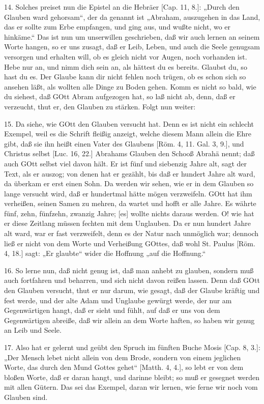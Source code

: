 14. Solches preiset nun die Epistel an die Hebräer [Cap. 11, 8.]: „Durch den Glauben ward gehorsam“, der da genannt ist „Abraham, auszugehen in das Land, das er sollte zum Erbe empfangen, und ging aus, und wußte nicht, wo er hinkäme.“ Das ist nun um unserwillen geschrieben, daß wir auch lernen an seinem Worte hangen, so er uns zusagt, daß er Leib, Leben, und auch die Seele genugsam versorgen und erhalten will, ob es gleich nicht vor Augen, noch vorhanden ist. Hebe nur an, und nimm dich sein an, als hättest du es bereits. Glaubst du, so hast du es. Der Glaube kann dir nicht fehlen noch trügen, ob es schon sich so ansehen läßt, als wollten alle Dinge zu Boden gehen. Komm es nicht so bald, wie du siehest, daß GOtt Abram aufgezogen hat, so laß nicht ab, denn, daß er verzeucht, thut er, den Glauben zu stärken. Folgt nun weiter:

15. Da siehe, wie GOtt den Glauben versucht hat. Denn es ist nicht ein schlecht Exempel, weil es die Schrift fleißig anzeigt, welche diesem Mann allein die Ehre gibt, daß sie ihn heißt einen Vater des Glaubens [Röm. 4, 11. Gal. 3, 9.], und Christus selbst [Luc. 16, 22.] Abrahams Glauben den Schooß Abrahä nennt; daß auch GOtt selbst viel davon hält. Er ist fünf und siebenzig Jahre alt, sagt der Text, als er auszog; von denen hat er gezählt, bis daß er hundert Jahre alt ward, da überkam er erst einen Sohn. Da werden wir sehen, wie er in dem Glauben so lange versucht wird, daß er hundertmal hätte mögen verzweifeln. GOtt hat ihm verheißen, seinen Samen zu mehren, da wartet und hofft er alle Jahre. Es währte fünf, zehn, fünfzehn, zwanzig Jahre; [es] wollte nichts daraus werden. O! wie hat er diese Zeitlang müssen fechten mit dem Unglauben. Da er nun hundert Jahre alt ward, war er fast verzweifelt, denn es der Natur nach unmöglich war; dennoch ließ er nicht von dem Worte und Verheißung GOttes, daß wohl St. Paulus [Röm. 4, 18.] sagt: „Er glaubte“ wider die Hoffnung „auf die Hoffnung.“

16. So lerne nun, daß nicht genug ist, daß man anhebt zu glauben, sondern muß auch fortfahren und beharren, und sich nicht davon reißen lassen. Denn daß GOtt den Glauben versucht, thut er nur darum, wie gesagt, daß der Glaube kräftig und fest werde, und der alte Adam und Unglaube gewürgt werde, der nur am Gegenwärtigen hangt, daß er sieht und fühlt, auf daß er uns von dem Gegenwärtigen abreiße, daß wir allein an dem Worte haften, so haben wir genug an Leib und Seele.

17. Also hat er gelernt und geübt den Spruch
im fünften Buche Mosis [Cap. 8, 3.]: „Der Mensch lebet nicht allein von dem Brode, sondern von einem jeglichen Worte, das durch den Mund Gottes gehet“ [Matth. 4, 4.], so lebt er von dem bloßen Worte, daß er daran hangt, und darinne bleibt; so muß er gesegnet werden mit allen Gütern. Das sei das Exempel, daran wir lernen, wie ferne wir noch vom Glauben sind.

